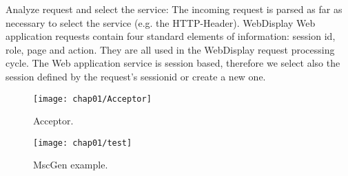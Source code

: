 Analyze request and select the service:
The incoming request is parsed as far as necessary to select the service (e.g.
the HTTP-Header). WebDisplay Web application requests contain four standard
elements of information: session id, role, page and action. They are all used in
the WebDisplay request processing cycle. The Web application service is session
based, therefore we select also the session defined by the request’s sessionid
or create a new one.

\begin{figure}[hbt]
  \centering
  \texttt{[image: chap01/Acceptor]}
  \caption{Acceptor.}
  \label{fig:zipstream}
\end{figure}

\begin{figure}[hbt]
  \centering
  \texttt{[image: chap01/test]}
  \caption{MscGen example.}
  \label{fig:mscgen_example}
\end{figure}
